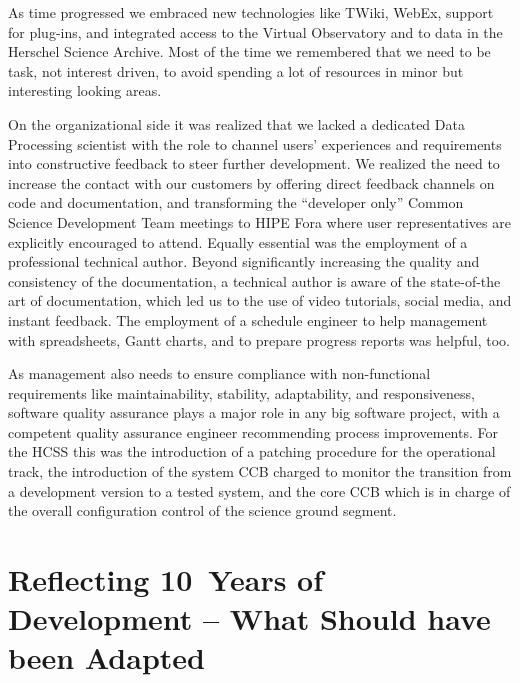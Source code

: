 As time progressed we embraced new technologies like TWiki, WebEx, support for plug-ins, and integrated access to the Virtual Observatory and to data in the Herschel Science Archive. Most of the time we remembered that we need to be task, not interest driven, to avoid spending a lot of resources in minor but interesting looking areas.

On the organizational side it was realized that we lacked a dedicated Data Processing scientist with the role to channel users' experiences and requirements into constructive feedback to steer further development. We realized the need to increase the contact with our customers by offering direct feedback channels on code and documentation, and transforming the ``developer only'' Common Science Development Team meetings to HIPE Fora where user representatives are explicitly encouraged to attend. Equally essential was the employment of a professional technical author. Beyond significantly increasing the quality and consistency of the documentation, a technical author is aware of the state-of-the art of documentation, which led us to the use of video tutorials, social media, and instant feedback. The employment of a schedule engineer to help management with spreadsheets, Gantt charts, and to prepare progress reports was helpful, too.

As management also needs to ensure compliance with non-functional requirements like maintainability, stability, adaptability, and responsiveness, software quality assurance plays a major role in any big software project, with a competent quality assurance engineer recommending process improvements. For the HCSS this was the introduction of a patching procedure for the operational track, the introduction of the system CCB charged to monitor the transition from a development version to a tested system, and the core CCB which is in charge of the overall configuration control of the science ground segment.

\section{Reflecting 10~Years of Development -- What Should have been Adapted}

